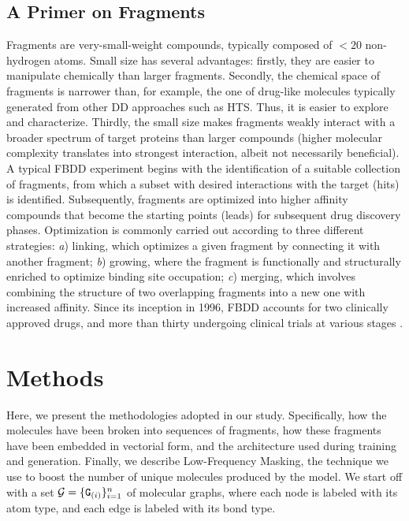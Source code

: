 \subsection{A Primer on Fragments}
Fragments are very-small-weight compounds, typically composed of $<20$ non-hydrogen atoms. Small size has several advantages: firstly, they are easier to manipulate chemically than larger fragments. Secondly, the chemical space of fragments is narrower than, for example, the one of drug-like molecules typically generated from other DD approaches such as HTS. Thus, it is easier to explore and characterize. Thirdly, the small size makes fragments weakly interact with a broader spectrum of target proteins than larger compounds (higher molecular complexity translates into strongest interaction, albeit not necessarily beneficial). A typical FBDD experiment begins with the identification of a suitable collection of fragments, from which a subset with desired interactions with the target (hits) is identified. Subsequently, fragments are optimized into higher affinity compounds that become the starting points (leads) for subsequent drug discovery phases. Optimization is commonly carried out according to three different strategies: \emph{a}) linking, which optimizes a given fragment by connecting it with another fragment; \emph{b}) growing, where the fragment is functionally and structurally enriched to optimize binding site occupation; \emph{c}) merging, which involves combining the structure of two overlapping fragments into a new one with increased affinity.
Since its inception in 1996, FBDD accounts for two clinically approved drugs, and more than thirty undergoing clinical trials at various stages \citep{davis2017fbdd}.

\section{Methods}
Here, we present the methodologies adopted in our study. Specifically, how the molecules have been broken into sequences of fragments, how these fragments have been embedded in vectorial form, and the architecture used during training and generation. Finally, we describe Low-Frequency Masking, the technique we use to boost the number of unique molecules produced by the model. We start off with a set $\mathcal{G} = \{\PatternGraph{G}{i}\}_{i=1}^n$ of molecular graphs, where each node is labeled with its atom type, and each edge is labeled with its bond type.


